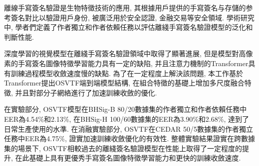 離線手寫簽名驗證是生物特徵技術的應用, 其根據用戶提供的手寫簽名与存儲的参考簽名對比以驗證用戶身份, 被廣泛用於安全認證, 金融交易等安全領域. 學術研究中, 學者們定義了作者獨立和作者依賴任務以評估離綫手寫簽名驗證模型的泛化和判斷性能.

深度學習的視覺模型在離綫手寫簽名驗證領域中取得了顯著進展, 但是模型對高像素的手寫簽名圖像特徵學習能力具有一定的缺陷, 并且注意力機制的Transformer具有訓練過程模型收斂速度慢的缺點. 為了在一定程度上解決該問題, 本工作基於Transformer提出OSVTF端到端模型結構, 在組合特徵的基礎上增加多尺度融合特徵, 并且對部分子網絡進行了加速訓練收斂的優化. 

在實驗部分, OSVTF模型在BHSig-B 80/20數據集的作者獨立和作者依賴任務中EER為4.54\%和2.13\%, 在BHSig-H 100/60數據集的EER為3.90\%和2.68\%, 達到了日常生產使用的水準. 在消融實驗部分, OSVTF在CEDAR 50/5數據集的作者獨立任務中EER為4.75\%, 證實加速訓練收斂優化的有效性. 整體實驗結果證實在跨數據集的場景下, OSVTF相較過去的離綫簽名驗證模型在性能上取得了一定程度的提升, 在此基礎上具有更優秀手寫簽名圖像特徵學習能力和更快的訓練收斂速度.












